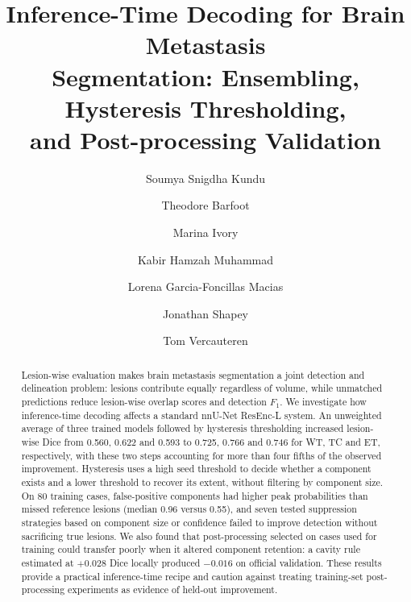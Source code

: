 \documentclass[runningheads]{llncs}
\begin{document}
\title{Inference-Time Decoding for Brain Metastasis\\ Segmentation: Ensembling, Hysteresis Thresholding,\\ and Post-processing Validation}

\author{%
Soumya Snigdha Kundu \and
Theodore Barfoot \and
Marina Ivory \and
Kabir Hamzah Muhammad \and
Lorena Garcia-Foncillas Macias \and
Jonathan Shapey \and
Tom Vercauteren%
}


\maketitle

\begin{abstract}
Lesion-wise evaluation makes brain metastasis segmentation a joint detection and delineation
problem: lesions contribute equally regardless of volume, while unmatched predictions reduce
lesion-wise overlap scores and detection $F_1$. We investigate how inference-time decoding affects
a standard nnU-Net ResEnc-L system. An unweighted average of three trained models followed by
hysteresis thresholding increased lesion-wise Dice from 0.560, 0.622 and 0.593 to
0.725, 0.766 and 0.746 for WT, TC and ET, respectively, with these two steps accounting for more than four fifths of the observed
improvement. Hysteresis uses a high seed threshold to decide whether a component exists and a
lower threshold to recover its extent, without filtering by component size. On 80 training cases,
false-positive components had higher peak probabilities than missed reference lesions (median
0.96 versus 0.55), and seven tested suppression strategies based on component size or confidence
failed to improve detection without sacrificing true lesions. We also found that post-processing
selected on cases used for training could transfer poorly when it altered component retention: a
cavity rule estimated at $+0.028$ Dice locally produced $-0.016$ on official validation. These
results provide a practical inference-time recipe and caution against treating training-set
post-processing experiments as evidence of held-out improvement.

\end{abstract}
\end{document}
